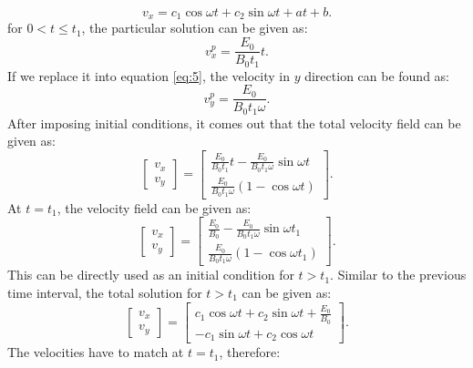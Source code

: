 \documentclass[11pt]{amsart}
\begin{document}
\begin{equation}
\label{eq:9}
v_{x}=c_1 \cos{\omega t}+ c_2 \sin{\omega t}+ a t+b.
\end{equation}
for $0<t \leq t_1$, the particular solution can be given as:
\begin{equation}
\label{eq:10}
v_{x}^p=\frac{E_0 }{B_0 t_1}t.
\end{equation}
If we replace it into equation \ref{eq:5}, the velocity in $y$ direction can be found as:
\begin{equation}
\label{eq:11}
v_{y}^p=\frac{E_0 }{B_0 t_1 \omega}.
\end{equation}
After imposing initial conditions, it comes out that the total velocity field can be given as:
\begin{equation}
\label{eq:12}
\begin{bmatrix}
v_x\\ 
v_y
\end{bmatrix}
=
\begin{bmatrix}
\frac{E_0 }{B_0 t_1}t-\frac{E_0 }{B_0 t_1 \omega}\sin{\omega t}\\ 
\frac{E_0 }{B_0 t_1 \omega}(1-\cos{\omega t})
\end{bmatrix}.
\end{equation}
At $t=t_1$, the velocity field can be given as:
\begin{equation}
\label{eq:13}
\begin{bmatrix}
v_x\\ 
v_y
\end{bmatrix}
=
\begin{bmatrix}
\frac{E_0 }{B_0}-\frac{E_0 }{B_0 t_1 \omega}\sin{\omega t_1}\\ 
\frac{E_0 }{B_0 t_1 \omega}(1-\cos{\omega t_1})
\end{bmatrix}.
\end{equation}
This can be directly used as an initial condition for $t>t_1$. Similar to the previous time interval, the total solution for $t>t_1$ can be given as:
\begin{equation}
\label{eq:14}
\begin{bmatrix}
v_x\\ 
v_y
\end{bmatrix}
=
\begin{bmatrix}
c_1 \cos{\omega t} + c_2 \sin{\omega t} +\frac{E_0}{B_0} \\ 
-c_1 \sin{\omega t} + c_2 \cos{\omega t}
\end{bmatrix}.
\end{equation}
The velocities have to match at $t=t_1$, therefore:
\end{document}
